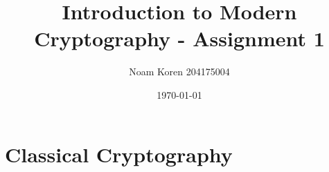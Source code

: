 \documentclass{article}
\begin{document}
    \title{Introduction to Modern Cryptography - Assignment 1}
    \author{Noam Koren 204175004}
    \date{\today}
    \maketitle

\section{Classical Cryptography}
\end{document}
